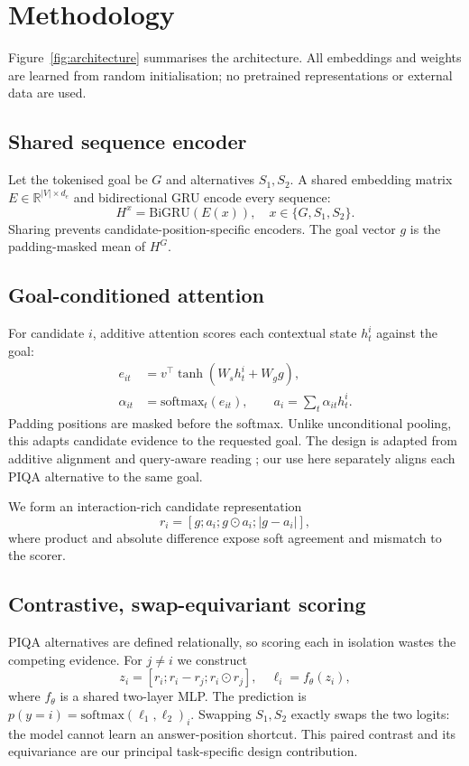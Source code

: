 \documentclass[11pt]{article}
\begin{document}
\section{Methodology}
Figure~\ref{fig:architecture} summarises the architecture. All embeddings and weights are learned from random initialisation; no pretrained representations or external data are used.

\subsection{Shared sequence encoder}
Let the tokenised goal be $G$ and alternatives $S_1,S_2$. A shared embedding matrix $E\in\mathbb{R}^{|V|\times d_e}$ and bidirectional GRU encode every sequence:
\begin{equation}
 H^x=\mathrm{BiGRU}(E(x)), \quad x\in\{G,S_1,S_2\}.
\end{equation}
Sharing prevents candidate-position-specific encoders. The goal vector $g$ is the padding-masked mean of $H^G$.

\subsection{Goal-conditioned attention}
For candidate $i$, additive attention scores each contextual state $h^i_t$ against the goal:
\begin{align}
 e_{it}&=v^\top\tanh(W_s h^i_t+W_g g),\\
 \alpha_{it}&=\mathrm{softmax}_{t}(e_{it}),\qquad
 a_i=\sum_t\alpha_{it}h^i_t .
\end{align}
Padding positions are masked before the softmax. Unlike unconditional pooling, this adapts candidate evidence to the requested goal. The design is adapted from additive alignment \citep{bahdanau2015attention} and query-aware reading \citep{seo2017bidaf}; our use here separately aligns each PIQA alternative to the same goal.

We form an interaction-rich candidate representation
\begin{equation}
 r_i=[g;a_i;g\odot a_i;|g-a_i|],
\end{equation}
where product and absolute difference expose soft agreement and mismatch to the scorer.

\subsection{Contrastive, swap-equivariant scoring}
PIQA alternatives are defined relationally, so scoring each in isolation wastes the competing evidence. For $j\neq i$ we construct
\begin{equation}
 z_i=[r_i;r_i-r_j;r_i\odot r_j], \quad \ell_i=f_\theta(z_i),
\end{equation}
where $f_\theta$ is a shared two-layer MLP. The prediction is $p(y=i)=\mathrm{softmax}(\ell_1,\ell_2)_i$. Swapping $S_1,S_2$ exactly swaps the two logits: the model cannot learn an answer-position shortcut. This paired contrast and its equivariance are our principal task-specific design contribution.
\end{document}
